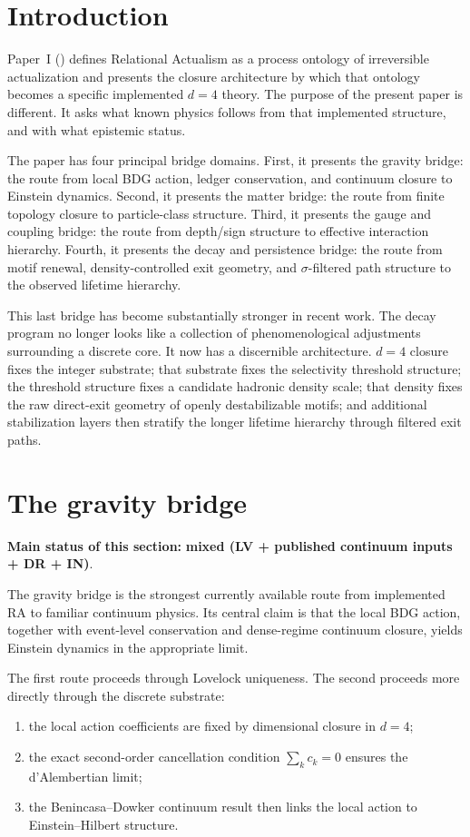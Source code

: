 \documentclass[11pt]{article}
\begin{document}
\section{Introduction}
Paper~I (\cite{RAKernelPaper}) defines Relational Actualism as a process ontology of irreversible actualization and presents the closure architecture by which that ontology becomes a specific implemented $d=4$ theory. The purpose of the present paper is different. It asks what known physics follows from that implemented structure, and with what epistemic status.

The paper has four principal bridge domains. First, it presents the gravity bridge: the route from local BDG action, ledger conservation, and continuum closure to Einstein dynamics. Second, it presents the matter bridge: the route from finite topology closure to particle-class structure. Third, it presents the gauge and coupling bridge: the route from depth/sign structure to effective interaction hierarchy. Fourth, it presents the decay and persistence bridge: the route from motif renewal, density-controlled exit geometry, and $\sigma$-filtered path structure to the observed lifetime hierarchy.

This last bridge has become substantially stronger in recent work. The decay program no longer looks like a collection of phenomenological adjustments surrounding a discrete core. It now has a discernible architecture. $d=4$ closure fixes the integer substrate; that substrate fixes the selectivity threshold structure; the threshold structure fixes a candidate hadronic density scale; that density fixes the raw direct-exit geometry of openly destabilizable motifs; and additional stabilization layers then stratify the longer lifetime hierarchy through filtered exit paths.

\section{The gravity bridge}
\textbf{Main status of this section:} \textbf{mixed (LV + published continuum inputs + DR + IN)}.

The gravity bridge is the strongest currently available route from implemented RA to familiar continuum physics. Its central claim is that the local BDG action, together with event-level conservation and dense-regime continuum closure, yields Einstein dynamics in the appropriate limit.

The first route proceeds through Lovelock uniqueness. The second proceeds more directly through the discrete substrate:
\begin{enumerate}[label=\arabic*.]
    \item the local action coefficients are fixed by dimensional closure in $d=4$;
    \item the exact second-order cancellation condition $\sum_k c_k = 0$ ensures the d'Alembertian limit;
    \item the Benincasa--Dowker continuum result then links the local action to Einstein--Hilbert structure.
\end{enumerate}
\end{document}
